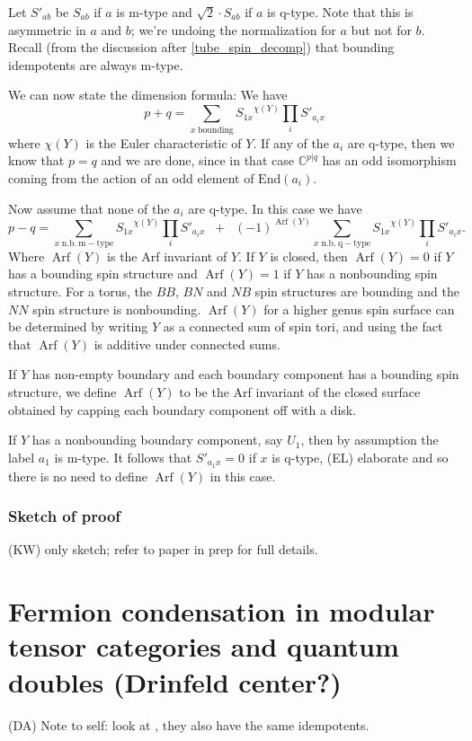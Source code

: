 \documentclass[12pt,a4paper]{article}
\newcommand{\cc}{\mathbb{C}}
\newcommand\be            {\begin{equation}}
\newcommand\ee            {\end{equation}}
\newcommand{\End}{\text{End}}
\DeclareMathOperator{\Arf}{Arf}
\newcommand{\dave}[1]{{\color{ao(english)}\footnotesize{(DA) #1}}}
\newcommand{\ethan}[1]{{\color{amethyst}\footnotesize{(EL) #1}}}
\newcommand{\kw}[1]{{\color{kwcolor}\footnotesize{(KW) #1}}}
\begin{document}
Let $S'_{ab}$ be $S_{ab}$ if $a$ is m-type and $\sqrt 2 \cdot S_{ab}$ if $a$ is q-type.
Note that this is asymmetric in $a$ and $b$;
we're undoing the normalization for $a$ but not for $b$.
Recall (from the discussion after \eqref{tube_spin_decomp}) that bounding idempotents are always m-type.

\medskip

We can now state the dimension formula:
We have
\be
	p + q = \sum_{x\;  \mathrm{bounding}} {S_{1x}}^{\chi(Y)} {\textstyle \prod_i} S'_{a_i x} 
	\label{PplusQ}
\ee
where $\chi(Y)$ is the Euler characteristic of $Y$.
If any of the $a_i$ are q-type, then we know that $p=q$ and we are done, since in that case 
$\cc^{p|q}$ has an odd isomorphism coming from the action of an odd element of $\End(a_i)$.

Now assume that none of the $a_i$ are q-type.
In this case we have
\be
	p - q = \sum_{x\;  \mathrm{n.b.\ m-type}} {S_{1x}}^{\chi(Y)} {\textstyle \prod_i} S'_{a_i x}
			\;\;+\;\; (-1)^{\Arf(Y)} \sum_{x\;  \mathrm{n.b.\ q-type}} {S_{1x}}^{\chi(Y)} {\textstyle \prod_i} S'_{a_i x} .
			\label{PminusQ}
\ee
Where $\Arf(Y)$ is the Arf invariant of $Y$.
If $Y$ is closed, then $\Arf(Y) = 0$ if $Y$ has a bounding spin structure and 
$\Arf(Y) = 1$ if $Y$ has a nonbounding spin structure.
For a torus, the $BB$, $BN$ and $NB$ spin structures are bounding and the $NN$ spin structure is nonbounding.
$\Arf(Y)$ for a higher genus spin surface can be determined by writing $Y$ as a connected sum of spin tori,
and using the fact that $\Arf(Y)$ is additive under connected sums.

If $Y$ has non-empty boundary and each boundary component has a bounding spin structure, 
we define $\Arf(Y)$ to be the Arf invariant of the closed 
surface obtained by capping each boundary component off with a disk.

If $Y$ has a nonbounding boundary component, say $U_1$, then by assumption
the label $a_1$ is m-type.
It follows that $S'_{a_1 x} = 0$ if $x$ is q-type, \ethan{elaborate} 
and so there is no need to define $\Arf(Y)$ in this case.




\subsubsection{Sketch of proof}


\kw{only sketch; refer to paper in prep for full details.}

\section{Fermion condensation in modular tensor categories and quantum doubles (Drinfeld center?)}
\dave{Note to self: look at \cite{Koenig2010}, they also have the same idempotents.}
\end{document}

